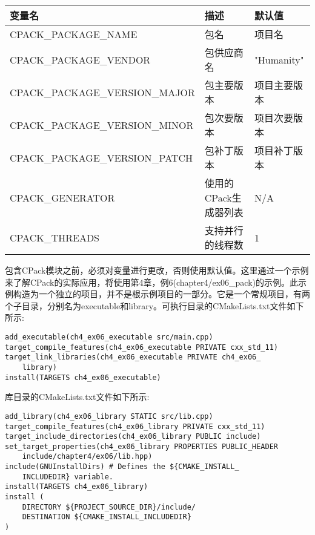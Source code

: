 \begin{table}[H]
	\centering
	\begin{tabular}{|l|l|l|}
		\hline
		\textbf{变量名}         & \textbf{描述}            & \textbf{默认值} \\ \hline
		CPACK\_PACKAGE\_NAME           & 包名                    & 项目名           \\ \hline
		CPACK\_PACKAGE\_VENDOR         & 包供应商名             & "Humanity"             \\ \hline
		CPACK\_PACKAGE\_VERSION\_MAJOR & 包主要版本           & 项目主要版本  \\ \hline
		CPACK\_PACKAGE\_VERSION\_MINOR & 包次要版本           & 项目次要版本  \\ \hline
		CPACK\_PACKAGE\_VERSION\_PATCH & 包补丁版本           & 项目补丁版本  \\ \hline
		CPACK\_GENERATOR               & 使用的CPack生成器列表 & N/A                    \\ \hline
		CPACK\_THREADS & 支持并行的线程数 & 1 \\ \hline
	\end{tabular}
\end{table}

包含CPack模块之前，必须对变量进行更改，否则使用默认值。这里通过一个示例来了解CPack的实际应用，将使用第4章，例6(chapter4/ex06\_pack)的示例。此示例构造为一个独立的项目，并不是根示例项目的一部分。它是一个常规项目，有两个子目录，分别名为executable和library。可执行目录的CMakeLists.txt文件如下所示:

\begin{lstlisting}[style=styleCMake]
add_executable(ch4_ex06_executable src/main.cpp)
target_compile_features(ch4_ex06_executable PRIVATE cxx_std_11)
target_link_libraries(ch4_ex06_executable PRIVATE ch4_ex06_
	library)
install(TARGETS ch4_ex06_executable)
\end{lstlisting}

库目录的CMakeLists.txt文件如下所示:

\begin{lstlisting}[style=styleCMake]
add_library(ch4_ex06_library STATIC src/lib.cpp)
target_compile_features(ch4_ex06_library PRIVATE cxx_std_11)
target_include_directories(ch4_ex06_library PUBLIC include)
set_target_properties(ch4_ex06_library PROPERTIES PUBLIC_HEADER
	include/chapter4/ex06/lib.hpp)
include(GNUInstallDirs) # Defines the ${CMAKE_INSTALL_
	INCLUDEDIR} variable.
install(TARGETS ch4_ex06_library)
install (
	DIRECTORY ${PROJECT_SOURCE_DIR}/include/
	DESTINATION ${CMAKE_INSTALL_INCLUDEDIR}
)
\end{lstlisting}

